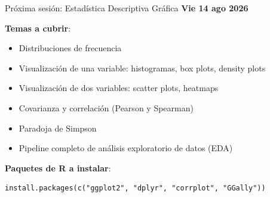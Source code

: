 \documentclass[aspectratio=169, 11pt]{beamer}
\begin{document}
\begin{frame}[fragile]{Próxima sesión: Estadística Descriptiva Gráfica}
\textbf{Vie 14 ago 2026}

\textbf{Temas a cubrir}:
\begin{itemize}
\item Distribuciones de frecuencia
\item Visualización de una variable: histogramas, box plots, density plots
\item Visualización de dos variables: scatter plots, heatmaps
\item Covarianza y correlación (Pearson y Spearman)
\item Paradoja de Simpson
\item Pipeline completo de análisis exploratorio de datos (EDA)
\end{itemize}

\vspace{1em}
\textbf{Paquetes de R a instalar}:
\begin{lstlisting}
install.packages(c("ggplot2", "dplyr", "corrplot", "GGally"))
\end{lstlisting}
\end{frame}
\end{document}
